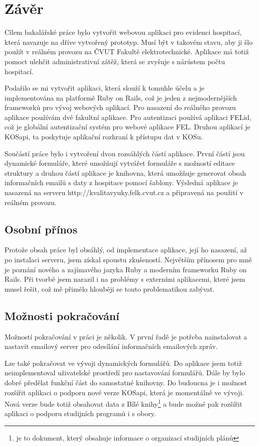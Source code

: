\chapter{Závěr}

Cílem bakalářské práce bylo vytvořit webovou aplikaci pro evidenci hospitací, která navazuje na dříve vytvořený prototyp. Musí být v takovém stavu, aby ji šlo použít v reálném provozu na ČVUT Fakultě elektrotechnické. Aplikace má totiž pomoct ulehčit administrativní zátěž, která se zvyšuje s nárůstem počtu hospitací. 

Podařilo se mi vytvořit aplikaci, která slouží k tomuhle účelu a je implementována na platformě Ruby on Rails, což je jeden z nejmodernějších frameworků pro vývoj webových aplikací. Pro nasazení do reálného provozu aplikace používám dvě fakultní aplikace. Pro autentizaci používá aplikaci FELid, což je globální autentizační systém pro webové aplikace FEL. Druhou aplikací je KOSapi, ta poskytuje aplikační rozhraní k přístupu dat v KOSu.

Součástí práce bylo i vytvoření dvou rozsáhlých částí aplikace. První částí jsou dynamické formuláře, které umožňují vytvářet formuláře s možností editace struktury a druhou částí aplikace je knihovna, která umožňuje generovat obsah informačních emailů s daty z hospitace pomocí šablony. Výsledná aplikace je nasazená na serveru http://kvalitavyuky.felk.cvut.cz a připravená na použití v reálném provozu.

\section{Osobní přínos}
Protože obsah práce byl obsáhlý, od implementace aplikace, její ho nasazení, až po instalaci serveru, jsem získal spoustu zkušeností. Největším přínosem pro mně je poznání nového a zajímavého jazyka Ruby a moderním  frameworku Ruby on Rails. Při tvorbě jsem narazil i na problémy s externími aplikacemi, které jsem musel řešit, což mě přimělo hlouběji se touto problematikou zabývat.

\section{Možnosti pokračování}
Možností pokračování v práci je několik. V první řadě je potřeba nainstalovat a nastavit emailový server pro odesílání informačních emailových zpráv.

Lze také pokračovat ve vývoji dynamických formulářů. Do aplikace jsem totiž neimplementoval uživatelské prostředí pro nastavování formulářů. Dále by bylo dobré předělat funkční část do samostatné knihovny. Do budoucna je i možnost rozšířit aplikaci o podporu nové verze KOSapi, která je momentálně ve vývoji. Nová verze bude totiž obsahovat data z Bílé knihy\footnote{je to dokument, který obsahuje informace o organizací studijních plánů} a bude možné pak rozšířit aplikaci o podporu studijních programů i s obory.